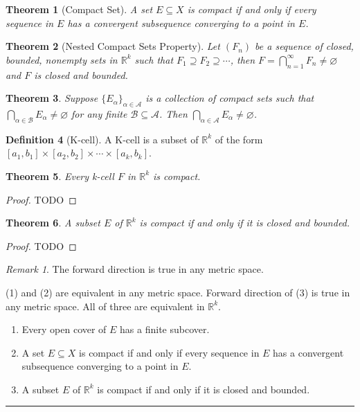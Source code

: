 \documentclass[12pt, lettersize]{book}
\theoremstyle{plain}
\newtheorem{thm}{Theorem}[section]
\theoremstyle{definition}
\newtheorem{dfn}[thm]{Definition}
\theoremstyle{remark}
\newtheorem*{rem}{Remark}
\newcommand{\R}{\mathbb{R}}
\newcommand{\lline}{\noindent\rule{\textwidth}{1pt}}
\let\emptyset\varnothing
\begin{document}
		\begin{thm}[Compact Set]
		A set $E\subseteq X$ is compact if and only if every sequence in $E$ has a convergent subsequence converging to a point in $E$.
		\end{thm}
		
		\begin{thm}[Nested Compact Sets Property]
		Let $(F_n)$ be a sequence of closed, bounded, nonempty sets in $\R^k$ such that $F_1\supseteq F_2\supseteq\cdots$, then $F=\bigcap_{n=1}^{\infty}F_n\neq\emptyset$ and $F$ is closed and bounded.
		\end{thm}
		
		\begin{thm}
		Suppose $\{E_\alpha\}_{\alpha\in\mathcal{A}}$ is a collection of compact sets such that $\bigcap_{\alpha\in\mathcal{B}}E_\alpha\neq\emptyset$ for any finite $\mathcal{B}\subseteq \mathcal{A}$. Then $\bigcap_{\alpha\in\mathcal{A}}E_\alpha\neq\emptyset$.
		\end{thm}
		
		\begin{dfn}[K-cell]
		A K-cell is a subset of $\R^k$ of the form $[a_1,b_1]\times[a_2,b_2]\times\cdots\times[a_k,b_k]$.
		\end{dfn}
		
		\begin{thm}
		Every k-cell $F$ in $\mathbb{R}^k$ is compact.
		\end{thm}
		\begin{proof}
		TODO
		\end{proof}
			
		\begin{thm}
		A subset $E$ of $\mathbb{R}^k$ is compact if and only if it is closed and bounded.
		\end{thm}
		\begin{proof}
			TODO
		\end{proof}
		\begin{rem}
			The forward direction is true in any metric space.
		\end{rem}
		
		\begin{tcolorbox}[title=\textbf{Characterization of compact sets}]
		(1) and (2) are equivalent in any metric space. Forward direction of (3) is true in any metric space. All of three are equivalent in $\R^k$.
		\begin{enumerate}
			\item Every open cover of $E$ has a finite subcover.
			\item A set $E\subseteq X$ is compact if and only if every sequence in $E$ has a convergent subsequence converging to a point in $E$.
			\item A subset $E$ of $\mathbb{R}^k$ is compact if and only if it is closed and bounded.
		\end{enumerate}
		\end{tcolorbox}
		\lline
		
\end{document}
